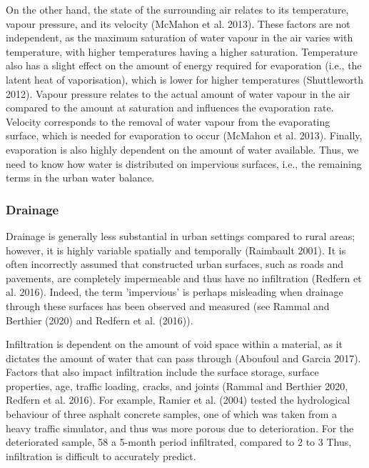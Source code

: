 \documentclass[final,3p,times,authoryear]{elsarticle}
\begin{document}
On the other hand, the state of the surrounding air relates to its temperature, vapour
pressure, and its velocity (McMahon et al. 2013). These factors are not independent, as
the maximum saturation of water vapour in the air varies with temperature, with higher
temperatures having a higher saturation. Temperature also has a slight effect on the
amount of energy required for evaporation (i.e., the latent heat of vaporisation), which is
lower for higher temperatures (Shuttleworth 2012). Vapour pressure relates to the actual
amount of water vapour in the air compared to the amount at saturation and influences
the evaporation rate. Velocity corresponds to the removal of water vapour from the
evaporating surface, which is needed for evaporation to occur (McMahon et al. 2013).
Finally, evaporation is also highly dependent on the amount of water available. Thus,
we need to know how water is distributed on impervious surfaces, i.e., the remaining
terms in the urban water balance.

\subsubsection{Drainage}\label{sec:appendix7.1.3.2}

Drainage is generally less substantial in urban settings compared to rural areas;
however, it is highly variable spatially and temporally (Raimbault 2001). It is often
incorrectly assumed that constructed urban surfaces, such as roads and pavements, are
completely impermeable and thus have no infiltration (Redfern et al. 2016). Indeed, the
term 'impervious' is perhaps misleading when drainage through these surfaces has been
observed and measured (see Rammal and Berthier (2020) and Redfern et al. (2016)).

Infiltration is dependent on the amount of void space within a material, as it dictates the
amount of water that can pass through (Aboufoul and Garcia 2017). Factors that also
impact infiltration include the surface storage, surface properties, age, traffic loading,
cracks, and joints (Rammal and Berthier 2020, Redfern et al. 2016).
For example, Ramier et al. (2004) tested the hydrological behaviour of three asphalt
concrete samples, one of which was taken from a heavy traffic simulator, and thus was
more porous due to deterioration. For the deteriorated sample, 58 %
a 5-month period infiltrated, compared to 2 to 3 %
Thus, infiltration is difficult to accurately predict.
\end{document}
